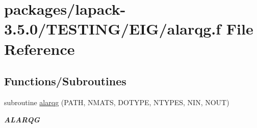 \hypertarget{alarqg_8f}{}\section{packages/lapack-\/3.5.0/\+T\+E\+S\+T\+I\+N\+G/\+E\+I\+G/alarqg.f File Reference}
\label{alarqg_8f}
\subsection*{Functions/\+Subroutines}
\begin{DoxyCompactItemize}
\item 
subroutine \hyperlink{group__aux__eig_ga8879a2d8dc2e86afd6b7e2269b7219ed}{alarqg} (P\+A\+T\+H, N\+M\+A\+T\+S, D\+O\+T\+Y\+P\+E, N\+T\+Y\+P\+E\+S, N\+I\+N, N\+O\+U\+T)
\begin{DoxyCompactList}\small\item\em {\bfseries A\+L\+A\+R\+Q\+G} \end{DoxyCompactList}\end{DoxyCompactItemize}
